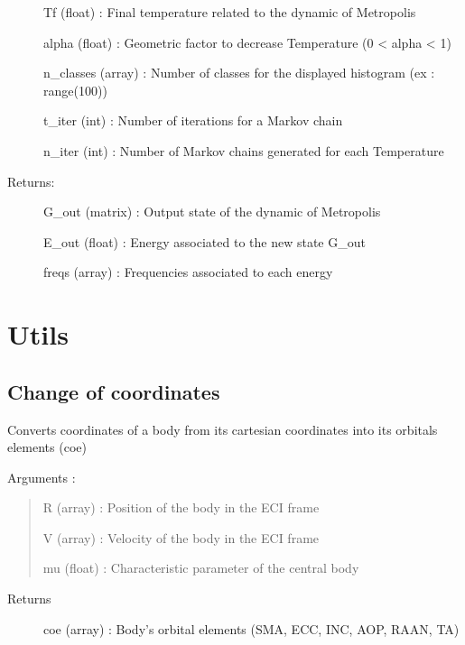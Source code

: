 \documentclass[letterpaper,10pt,english]{sphinxmanual}
\begin{document}
\begin{fulllineitems}
\begin{description}
Tf (float) : Final temperature related to the dynamic of Metropolis

alpha (float) : Geometric factor to decrease Temperature (0 \textless{} alpha \textless{} 1)

n\_classes (array) : Number of classes for the displayed histogram (ex : range(100))

t\_iter (int) : Number of iterations for a Markov chain

n\_iter (int) : Number of Markov chains generated for each Temperature

\item[{Returns:}] \leavevmode
G\_out (matrix) : Output state of the dynamic of Metropolis

E\_out (float) : Energy associated to the new state G\_out

freqs (array) : Frequencies associated to each energy

\end{description}

\end{fulllineitems}



\chapter{Utils}
\label{\detokenize{utils:utils}}\label{\detokenize{utils::doc}}

\section{Change of coordinates}
\label{\detokenize{utils:change-of-coordinates}}\label{\detokenize{utils:module-utils.coc}}

\begin{fulllineitems}
\label{\detokenize{utils:utils.coc.cart2kep}}
Converts coordinates of a body from its cartesian coordinates into its orbitals elements (coe)

Arguments :
\begin{quote}

R (array) : Position of the body in the ECI frame

V (array) : Velocity of the body in the ECI frame

mu (float) : Characteristic parameter of the central body
\end{quote}
\begin{description}
\item[{Returns}] \leavevmode{[}{]}
coe (array) : Body’s orbital elements (SMA, ECC, INC, AOP, RAAN, TA)

\end{description}

\end{fulllineitems}
\end{document}
